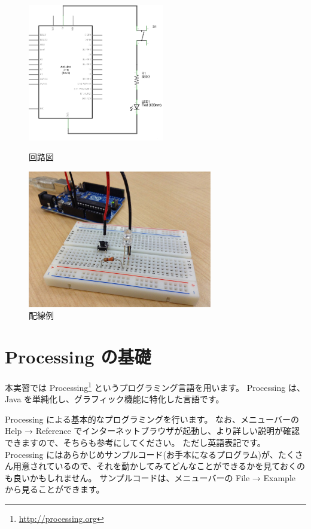\documentclass[11pt,a4paper]{jarticle}
\begin{document}
\begin{figure}[h!]
 \begin{minipage}{0.5\columnwidth}
  \centering
  \includegraphics[height=60mm]{img/circuit01.eps}
  \caption{回路図}
  \label{circuit}
 \end{minipage}
 \begin{minipage}{0.5\columnwidth}
  \centering
  \includegraphics[height=60mm]{img/sample_circuit.eps}
  \caption{配線例}
 \end{minipage}
\end{figure}

\section{Processing の基礎}
本実習では Processing\footnote{\url{http://processing.org}} というプログラミング言語を用います。
Processing は、Java を単純化し、グラフィック機能に特化した言語です。

Processing による基本的なプログラミングを行います。
なお、メニューバーの Help → Reference でインターネットブラウザが起動し、より詳しい説明が確認できますので、そちらも参考にしてください。
ただし英語表記です。
Processing にはあらかじめサンプルコード(お手本になるプログラム)が、たくさん用意されているので、それを動かしてみてどんなことができるかを見ておくのも良いかもしれません。
サンプルコードは、メニューバーの File → Example から見ることができます。
\end{document}
